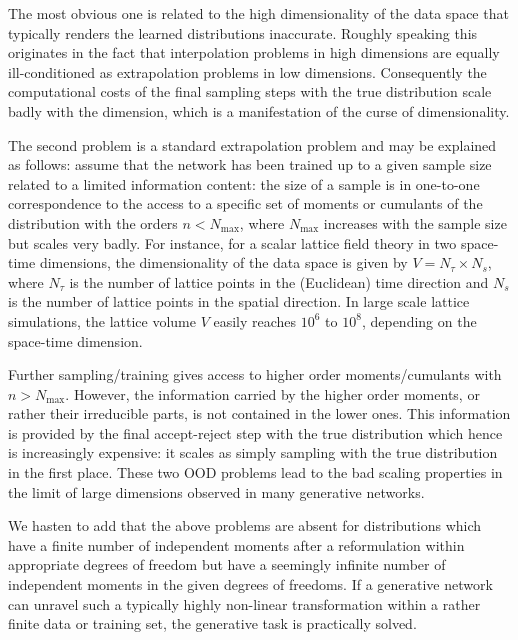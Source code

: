 \documentclass[reprint,amsmath,amssymb,aps,pra,superscriptaddress,nofootinbib,twocolumn,floatfix,nolongbibliography]{revtex4-2}
\begin{document}
The most obvious one is related to the high dimensionality of the data space that typically renders the learned distributions inaccurate. Roughly speaking this originates in the fact that interpolation problems in high dimensions are equally ill-conditioned as extrapolation problems in low dimensions. Consequently the computational costs of the final sampling steps with the true distribution scale badly with the dimension, which is a manifestation of the curse of dimensionality. 

The second problem is a standard extrapolation problem and may be explained as follows: assume that the network has been trained up to a given sample size related to a limited information content: the size of a sample is in one-to-one correspondence to the access to a specific set of moments or cumulants of the distribution with the orders $n<N_\textrm{max}$, where $N_\textrm{max}$ increases with the sample size but scales very badly. For instance, for a scalar lattice field theory in two space-time dimensions, the dimensionality of the data space is given by $V = N_\tau\times N_s$, where $N_\tau$ is the number of lattice points in the (Euclidean) time direction and $N_s$ is the number of lattice points in the spatial direction. In large scale lattice simulations, the lattice volume $V$ easily reaches $10^6$ to $10^8$, depending on the space-time dimension. 

Further sampling/training gives access to higher order moments/cumulants with $n>N_\textrm{max}$. However, the information carried by the higher order moments, or rather their irreducible parts, is not contained in the lower ones. This information is provided by the final accept-reject step with the true distribution which hence is increasingly expensive: it scales as simply sampling with the true distribution in the first place. These two OOD problems lead to the bad scaling properties in the limit of large dimensions observed in many generative networks. 



We hasten to add that the above problems are absent for distributions which have a finite number of independent moments after a reformulation within appropriate degrees of freedom but have a seemingly infinite number of independent moments in the given degrees of freedoms. If a generative network can unravel such a typically highly non-linear transformation within a rather finite data or training set, the generative task is practically solved. 
\end{document}
